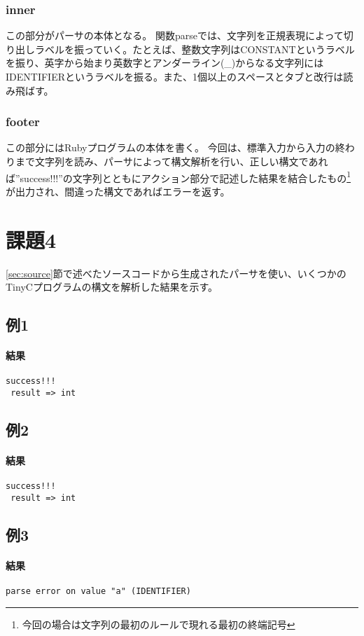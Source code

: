 \documentclass[titlepage, a4paper,12pt]{jarticle}
\begin{document}
\subsubsection{inner}
この部分がパーサの本体となる。
関数parseでは、文字列を正規表現によって切り出しラベルを振っていく。たとえば、整数文字列はCONSTANTというラベルを振り、英字から始まり英数字とアンダーライン(\_)からなる文字列にはIDENTIFIERというラベルを振る。また、1個以上のスペースとタブと改行は読み飛ばす。
\subsubsection{footer}
この部分にはRubyプログラムの本体を書く。
今回は、標準入力から入力の終わりまで文字列を読み、パーサによって構文解析を行い、正しい構文であれば''success!!!''の文字列とともにアクション部分で記述した結果を結合したもの\footnote{今回の場合は文字列の最初のルールで現れる最初の終端記号}が出力され、間違った構文であればエラーを返す。
\section{課題4}
\ref{sec:source}節で述べたソースコードから生成されたパーサを使い、いくつかのTinyCプログラムの構文を解析した結果を示す。
\subsection{例1}

\paragraph{結果}
\begin{verbatim}
success!!! 
 result => int
\end{verbatim}
\subsection{例2}

\paragraph{結果}
\begin{verbatim}
success!!! 
 result => int
\end{verbatim}
\subsection{例3}

\paragraph{結果}
\begin{verbatim}
parse error on value "a" (IDENTIFIER)
\end{verbatim}
\end{document}
